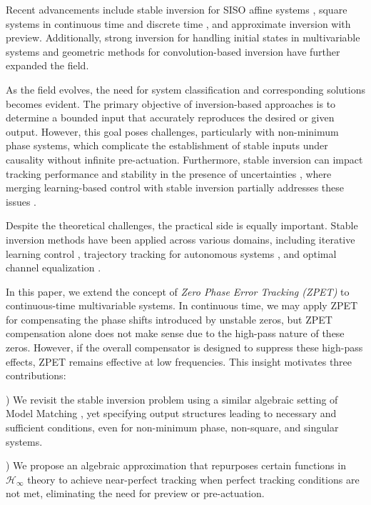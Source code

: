 \documentclass[journal]{IEEEtran}
\theoremstyle{remark}
\begin{document}
Recent advancements include stable inversion for SISO affine systems \cite{spiegel2024stable}, square systems in continuous time \cite{saeki2023model} and discrete time \cite{naderi2018inversion}, and approximate inversion with preview\cite{romagnoli2019general}. Additionally, {strong inversion} for handling initial states in multivariable systems \cite{Loreto2023} and geometric methods for convolution-based inversion \cite{marro2002convolution} have further expanded the field.

As the field evolves, the need for system classification and corresponding solutions becomes evident. The primary objective of inversion-based approaches is to determine a bounded input that accurately reproduces the desired or given output. However, this goal poses challenges, particularly with non-minimum phase systems, which complicate the establishment of stable inputs under causality without infinite pre-actuation. Furthermore, stable inversion can impact tracking performance and stability in the presence of uncertainties \cite{devasia2002should}, where merging learning-based control with stable inversion partially addresses these issues \cite{spiegel2024stable,kim2024asymptotic}.

Despite the theoretical challenges, the practical side is equally important. Stable inversion methods have been applied across various domains, including iterative learning control \cite{van2018inversion}, trajectory tracking for autonomous systems \cite{drucker2023trajectory}, and optimal channel equalization \cite{gu2003worst}.

In this paper, we extend the concept of \textit{Zero Phase Error Tracking (ZPET)} \cite{tomizuka1987zero} to continuous-time multivariable systems. In continuous time, we may apply ZPET for compensating the phase shifts introduced by unstable zeros, but ZPET compensation alone does not make
sense due to the  high-pass nature of these zeros. However, if the overall compensator is designed to suppress these high-pass effects, ZPET remains effective at low frequencies. This insight motivates three contributions:

) We revisit the stable inversion problem using a similar algebraic setting of Model Matching \cite{wolovich2012linear}, yet specifying output structures leading to necessary and sufficient conditions, even for non-minimum phase, non-square, and singular systems.

) We propose an algebraic approximation that repurposes certain functions in $\mathcal{H}_\infty$ theory to achieve near-perfect tracking when perfect tracking conditions are not met, eliminating the need for preview or pre-actuation.
\end{document}
